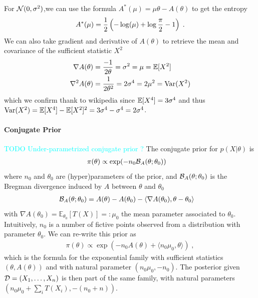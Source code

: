 \documentclass{article}
\newcommand{\TODO}[1]{\textcolor{cyan}{TODO #1}}
\newcommand*{\expect}[2][]{\ensuremath{\mathbb{E}_{#1} \left[ #2 \right] }} %
\newcommand{\logpart}{A}
\newcommand{\conj}{\logpart^*}
\newcommand{\bregman}{\cB_\logpart}
\newcommand{\natp}{\theta}
\newcommand{\meanp}{\mu}
\begin{document}
\begin{example}
For ${\mathcal N}(0,\sigma^2)$,we can use the formula $\conj(\mu) = \mu \natp - \logpart(\natp)$ to get the entropy
\begin{align}
	\conj(\mu) = \half\left( -\log(\mu) + \log\frac{\pi}{2} - 1 \right) \; .
\end{align}
We can also take gradient and derivative of $\logpart(\natp)$ to retrieve the mean and covariance of the sufficient statistic $X^2$
\begin{align}
	\nabla\logpart(\natp) &= \frac{-1}{2 \natp} = \sigma^2 = \mu = \E[X^2] \\
	\nabla^2\logpart(\natp) &= \frac{1}{2 \natp^2} = 2 \sigma^4 = 2 \mu^2 = \Var(X^2) 
\end{align}
which we confirm thank to wikipedia since $\operatorname{\mathbb{E}}[X^4] = 3 \sigma^4$ and thus $\operatorname{\mathrm{Var}}(X^2) = \operatorname{\mathbb{E}}[X^4] - \operatorname{\mathbb{E}}[X^2]^2 = 3 \sigma^4 - \sigma^4 = 2 \sigma^4$.
\end{example}

\paragraph{Conjugate Prior}
\TODO{Under-parametrized conjugate prior ?}
The conjugate prior for $p(X|\natp)$ is
\begin{align}
    \pi(\natp) &\propto \exp( - n_0 \bregman(\natp ; \natp_0) )
\end{align}
where $n_0$ and $\natp_0$ are (hyper)parameters of the prior, and $\bregman(\natp ; \natp_0)$ is the Bregman divergence induced by $\logpart$ between $\natp$ and $\natp_0$
\begin{align}
    \bregman (\natp ; \natp_0)
    & = \logpart(\natp) - \logpart(\natp_0) 
    - \langle \nabla \logpart(\natp_0)  , \natp - \natp_0 \rangle
\end{align}
with $\nabla \logpart(\natp_0) = \expect[\natp_0]{T(X)} =: \meanp_0$ the mean parameter associated to $\natp_0$. 
Intuitively, $n_0$ is a number of fictive points observed from a distribution with parameter $\natp_0$.
We can re-write this prior as 
\begin{align}
    \pi(\natp) \propto 
    \exp( -n_0 \logpart (\natp) 
    + \langle n_0 \mu_0, \natp \rangle ) \; ,
\end{align}
which is the formula for the exponential family with sufficient statistics $(\natp ,\logpart(\natp))$ and with natural parameter $(n_0 \mu_0, -n_0)$.
The posterior given ${\mathcal D}=(X_1,\dots, X_n)$ is then part of the same family, with natural parameters $(n_0 \mu_0 + \sum_i T(X_i) , -(n_0 + n))$.
\end{document}
